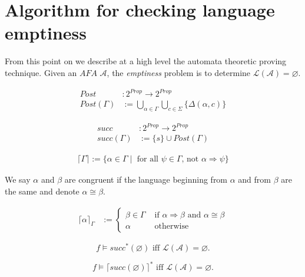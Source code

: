 \section{Algorithm for checking language emptiness}
From this point on we describe at a high level the automata theoretic proving technique. Given
an \( \mathit{AFA}\) \( \mathcal{A} \), the \textit{emptiness} problem is to
determine \( \mathcal{L}(\mathcal{A}) = \varnothing \).

\begin{definition}
\begin{align*}
  Post         &:  2^\mathit{Prop} \rightarrow 2^\mathit{Prop} \\
  Post(\Gamma) &:= \bigcup\limits_{ \alpha \in \Gamma } \bigcup\limits_{ c \in \Sigma } \{ \Delta(\alpha, c) \}
\end{align*}

\begin{align*}
\mathit{succ}         &:  2^\mathit{Prop} \rightarrow 2^\mathit{Prop} \\ 
\mathit{succ}(\Gamma) &:= \{ s \} \cup Post(\Gamma)
\end{align*}

\begin{align*}
  \lceil \Gamma \rceil := \{ \alpha \in \Gamma \mid \text{ for all } \psi \in \Gamma \text{, not } \alpha \Rightarrow \psi \}
\end{align*}

We say \( \alpha \) and \( \beta \) are congruent if the language beginning from
\( \alpha \) and from \( \beta \) are the same and denote \( \alpha \cong
\beta\).

\begin{align*}
  \lceil \alpha \rceil _{\Gamma} &:= \left\{ \begin{array}{ll}
    \beta \in \Gamma & \text{ if } \alpha \Rightarrow \beta \text{ and } \alpha \cong \beta \\
    \alpha & \text{ otherwise }
  \end{array} \right.
\end{align*}
\end{definition}

\begin{theorem}
[Emptiness] \[ f \models \mathit{succ}^*(\varnothing) \text{ iff }
\mathcal{L}(\mathcal{A}) = \varnothing. \]
\end{theorem}

\begin{theorem}
[Antichain] \[ f \models \lceil \mathit{succ}(\varnothing) \rceil^* \text{ iff }
\mathcal{L}(\mathcal{A}) = \varnothing. \]
\end{theorem}

